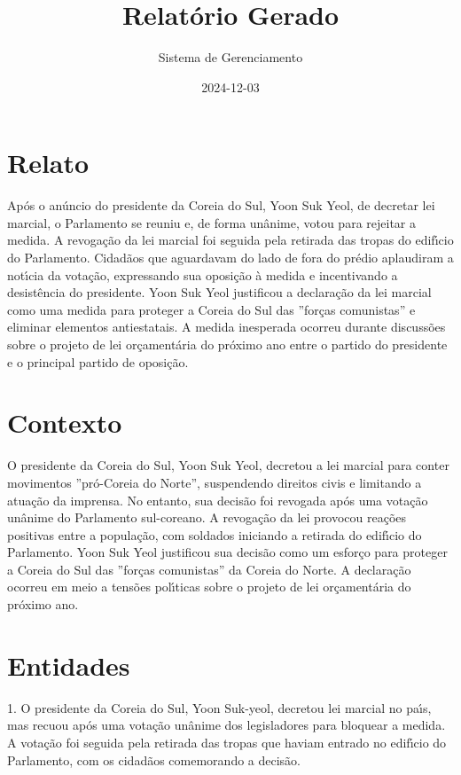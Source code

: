 \documentclass[article,11pt,oneside,a4paper,brazil,sumario=tradicional]{abntex2}%
\title{Relatório Gerado}%
\author{Sistema de Gerenciamento}%
\date{2024{-}12{-}03}%
\begin{document}
%
\normalsize%
\maketitle%
%
\frenchspacing%
\section{Relato}%
\label{sec:Relato}%
Ap\'os o an\'uncio do presidente da Coreia do Sul, Yoon Suk Yeol, de decretar lei marcial, o Parlamento se reuniu e, de forma un\^anime, votou para rejeitar a medida. A revoga\c{c}\~ao da lei marcial foi seguida pela retirada das tropas do edif{\'\i}cio do Parlamento. Cidad\~aos que aguardavam do lado de fora do pr\'edio aplaudiram a not{\'\i}cia da vota\c{c}\~ao, expressando sua oposi\c{c}\~ao \`a medida e incentivando a desist\^encia do presidente. Yoon Suk Yeol justificou a declara\c{c}\~ao da lei marcial como uma medida para proteger a Coreia do Sul das ''for\c{c}as comunistas'' e eliminar elementos antiestatais. A medida inesperada ocorreu durante discuss\~oes sobre o projeto de lei or\c{c}ament\'aria do pr\'oximo ano entre o partido do presidente e o principal partido de oposi\c{c}\~ao.

%
\section{Contexto}%
\label{sec:Contexto}%
O presidente da Coreia do Sul, Yoon Suk Yeol, decretou a lei marcial para conter movimentos ''pr\'o-Coreia do Norte'', suspendendo direitos civis e limitando a atua\c{c}\~ao da imprensa. No entanto, sua decis\~ao foi revogada ap\'os uma vota\c{c}\~ao un\^anime do Parlamento sul-coreano. A revoga\c{c}\~ao da lei provocou rea\c{c}\~oes positivas entre a popula\c{c}\~ao, com soldados iniciando a retirada do edif{\'\i}cio do Parlamento. Yoon Suk Yeol justificou sua decis\~ao como um esfor\c{c}o para proteger a Coreia do Sul das ''for\c{c}as comunistas'' da Coreia do Norte. A declara\c{c}\~ao ocorreu em meio a tens\~oes pol{\'\i}ticas sobre o projeto de lei or\c{c}ament\'aria do pr\'oximo ano.

%
\section{Entidades}%
\label{sec:Entidades}%
1. O presidente da Coreia do Sul, Yoon Suk-yeol, decretou lei marcial no pa{\'\i}s, mas recuou ap\'os uma vota\c{c}\~ao un\^anime dos legisladores para bloquear a medida. A vota\c{c}\~ao foi seguida pela retirada das tropas que haviam entrado no edif{\'\i}cio do Parlamento, com os cidad\~aos comemorando a decis\~ao.
\end{document}
